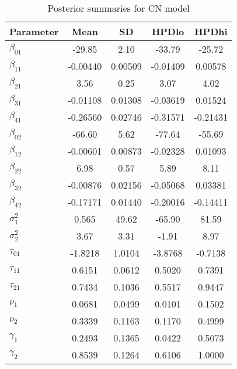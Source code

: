 \documentclass[10.5pt]{article} %
\begin{document}
\begin{table}[H]
\centering
\caption{Posterior summaries for CN model}
\begin{tabular}{lcccc}
\toprule
Parameter & Mean & SD & HPDlo & HPDhi \\
\midrule
$\beta_{01}$ & -29.85 & 2.10 & -33.79 & -25.72 \\
$\beta_{11}$ & -0.00440 & 0.00509 & -0.01409 & 0.00578 \\
$\beta_{21}$ & 3.56 & 0.25 & 3.07 & 4.02 \\
$\beta_{31}$ & -0.01108 & 0.01308 & -0.03619 & 0.01524 \\
$\beta_{41}$ & -0.26560 & 0.02746 & -0.31571 & -0.21431 \\
$\beta_{02}$ & -66.60 & 5.62 & -77.64 & -55.69 \\
$\beta_{12}$ & -0.00601 & 0.00873 & -0.02328 & 0.01093 \\
$\beta_{22}$ & 6.98 & 0.57 & 5.89 & 8.11 \\
$\beta_{32}$ & -0.00876 & 0.02156 & -0.05068 & 0.03381 \\
$\beta_{42}$ & -0.17171 & 0.01440 & -0.20016 & -0.14411 \\
$\sigma^2_1$ & 0.565 & 49.62 & -65.90 & 81.59 \\
$\sigma^2_2$ & 3.67 & 3.31 & -1.91 & 8.97 \\
$\tau_{01}$ & -1.8218 & 1.0104 & -3.8768 & -0.7138 \\
$\tau_{11}$ & 0.6151 & 0.0612 & 0.5020 & 0.7391 \\
$\tau_{21}$ & 0.7434 & 0.1036 & 0.5517 & 0.9447 \\
$\nu_1$ & 0.0681 & 0.0499 & 0.0101 & 0.1502 \\
$\nu_2$ & 0.3339 & 0.1163 & 0.1170 & 0.4999 \\
$\gamma_1$ & 0.2493 & 0.1365 & 0.0422 & 0.5073 \\
$\gamma_2$ & 0.8539 & 0.1264 & 0.6106 & 1.0000 \\
\bottomrule
\end{tabular}
\end{table}
\end{document}
